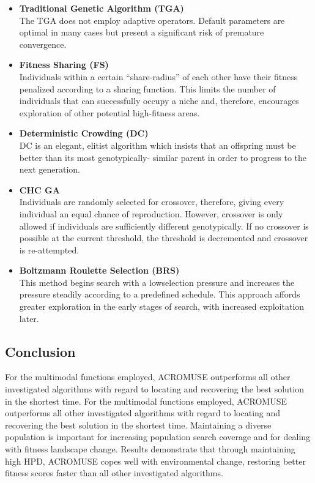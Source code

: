 \documentclass[../main.tex]{subfiles}
\begin{document}
\begin{itemize}
	\item \textbf{Traditional Genetic Algorithm (TGA)} \\
	The TGA does not employ adaptive operators. Default parameters are optimal in many cases but present a significant
	risk of premature convergence.

	\item \textbf{Fitness Sharing (FS)} \\
	Individuals within a certain ``share-radius'' of each other have their fitness penalized according to a sharing
	function. This limits the number of individuals that can successfully occupy a niche and, therefore, encourages
	exploration of other potential high-fitness areas.

	\item \textbf{Deterministic Crowding (DC)} \\
	DC is an elegant, elitist algorithm which insists that an offspring must be better than its most genotypically-
	similar parent in order to progress to the next generation.

	\item \textbf{CHC GA} \\
	Individuals are randomly selected for crossover, therefore, giving every individual an equal chance of
	reproduction. However, crossover is only allowed if individuals are sufficiently different genotypically. If no
	crossover is possible at the current threshold, the threshold is decremented and
	crossover is re-attempted.

	\item \textbf{Boltzmann Roulette Selection (BRS)} \\
	This method begins search with a lowselection pressure and increases the pressure steadily according to a
	predefined schedule. This approach affords greater exploration in the early stages of search, with increased
	exploitation later.
\end{itemize}

\subsection{Conclusion}
For the multimodal functions employed, ACROMUSE outperforms all other investigated algorithms with regard to locating
and recovering the best solution in the shortest time. For the multimodal functions employed, ACROMUSE outperforms all
other investigated algorithms with regard to locating and recovering the best solution in the shortest time.
Maintaining a diverse population is important for increasing population search coverage and for dealing with fitness
landscape change. Results demonstrate that through maintaining high HPD, ACROMUSE copes well with environmental change,
restoring better fitness scores faster than all other investigated algorithms.
\end{document}
